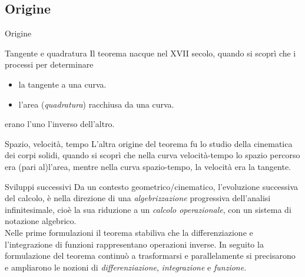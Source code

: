 \documentclass[8pt]{beamer}
\begin{document}
\subsection{Origine}
\begin{frame}{Origine}
  \begin{block}{Tangente e quadratura}
    Il teorema nacque nel XVII secolo, quando si scoprì che i processi per determinare
    \begin{itemize}
      \item
            la tangente a una curva.
      \item
            l'area (\textit{quadratura}) racchiusa da una curva.
    \end{itemize}
    erano l'uno l'inverso dell'altro.
  \end{block}

  \begin{block}{Spazio, velocità, tempo}
    L'altra origine del teorema fu lo studio della cinematica dei corpi solidi,
    quando si scoprì che nella curva velocità-tempo lo spazio percorso era (pari al)l'area,
    mentre nella curva spazio-tempo, la velocità era la tangente. 
  \end{block}

  \pause
  \begin{block}{Sviluppi successivi}
    Da un contesto geometrico/cinematico, l'evoluzione successiva del calcolo, è nella
    direzione di una \textit{algebrizzazione} progressiva dell'analisi infinitesimale,
    cioè la sua riduzione a un \textit{calcolo operazionale}, con un sistema di notazione algebrico.\\
    Nelle prime formulazioni il teorema stabiliva che la differenziazione e l'integrazione di funzioni
    rappresentano operazioni inverse.
    In seguito la formulazione del teorema continuò a trasformarsi e parallelamente
    si precisarono e ampliarono le nozioni di \textit{differenziazione}, \textit{integrazione} e \textit{funzione}.
  \end{block}
\end{frame}
\end{document}
